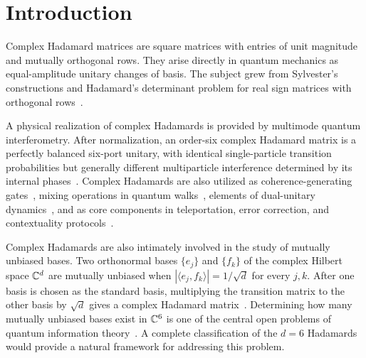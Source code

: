 \section{Introduction}
Complex Hadamard matrices are square matrices with entries of unit magnitude and mutually orthogonal rows. They arise directly in quantum mechanics as equal-amplitude unitary changes of basis. The subject grew from Sylvester's constructions and Hadamard's determinant problem for real sign matrices with orthogonal rows~\cite{Sylvester1867,Hadamard1893}. 

A physical realization of complex Hadamards is provided by multimode quantum interferometry. After normalization, an order-six complex Hadamard matrix is a perfectly balanced six-port unitary, with identical single-particle transition probabilities but generally different multiparticle interference determined by its internal phases~\cite{Carolan2015Universal,Laing2012BerryPhase,Tichy2010ZeroTransmission,Crespi2015Sylvester,Crespi2016FFT,Shchesnovich2015Partial}. Complex Hadamards are also utilized as coherence-generating gates~\cite{Yao2016MaximalCoherence}, mixing operations in quantum walks~\cite{Mackay2002QuantumWalks,Lorz2019PhotonicWalks}, elements of dual-unitary dynamics~\cite{Gutkin2020DualUnitary,Claeys2022StateDesigns}, and as core components in teleportation, error correction, and contextuality protocols~\cite{Werner2001Teleportation,Musto2016QuantumLatin,Lisonek2019KochenSpecker}. 

Complex Hadamards are also intimately involved in the study of mutually unbiased bases. Two orthonormal bases $\{e_j\}$ and $\{f_k\}$ of the complex Hilbert space $\mathbb C^d$ are mutually unbiased when $|\langle e_j,f_k\rangle|=1/\sqrt d$ for every $j,k$. After one basis is
chosen as the standard basis, multiplying the transition matrix to the other basis by $\sqrt d$ gives a complex Hadamard matrix~\cite{TadejZyczkowski2006,WoottersFields1989,BengtssonEtAl2007}.
Determining how many mutually unbiased bases exist in $\mathbb C^6$ is one of the central open problems of quantum information theory~\cite{HorodeckiRudnickiZyczkowski2022,McNultyWeigert2026,BengtssonEtAl2007,MatolcsiEtAl2026MUBTriplets}. A complete classification of the $d =6$ Hadamards would provide a natural framework for addressing this problem.

